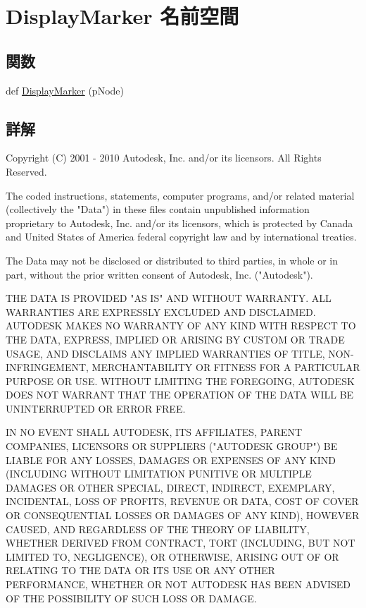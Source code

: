 \hypertarget{namespace_display_marker}{}\section{Display\+Marker 名前空間}
\label{namespace_display_marker}
\subsection*{関数}
\begin{DoxyCompactItemize}
\item 
def \hyperlink{namespace_display_marker_a8cd094b00b3f3c1b05570a7236e42bac}{Display\+Marker} (p\+Node)
\end{DoxyCompactItemize}


\subsection{詳解}
\begin{DoxyVerb} Copyright (C) 2001 - 2010 Autodesk, Inc. and/or its licensors.
 All Rights Reserved.

 The coded instructions, statements, computer programs, and/or related material 
 (collectively the "Data") in these files contain unpublished information 
 proprietary to Autodesk, Inc. and/or its licensors, which is protected by 
 Canada and United States of America federal copyright law and by international 
 treaties. 
 
 The Data may not be disclosed or distributed to third parties, in whole or in
 part, without the prior written consent of Autodesk, Inc. ("Autodesk").

 THE DATA IS PROVIDED "AS IS" AND WITHOUT WARRANTY.
 ALL WARRANTIES ARE EXPRESSLY EXCLUDED AND DISCLAIMED. AUTODESK MAKES NO
 WARRANTY OF ANY KIND WITH RESPECT TO THE DATA, EXPRESS, IMPLIED OR ARISING
 BY CUSTOM OR TRADE USAGE, AND DISCLAIMS ANY IMPLIED WARRANTIES OF TITLE, 
 NON-INFRINGEMENT, MERCHANTABILITY OR FITNESS FOR A PARTICULAR PURPOSE OR USE. 
 WITHOUT LIMITING THE FOREGOING, AUTODESK DOES NOT WARRANT THAT THE OPERATION
 OF THE DATA WILL BE UNINTERRUPTED OR ERROR FREE. 
 
 IN NO EVENT SHALL AUTODESK, ITS AFFILIATES, PARENT COMPANIES, LICENSORS
 OR SUPPLIERS ("AUTODESK GROUP") BE LIABLE FOR ANY LOSSES, DAMAGES OR EXPENSES
 OF ANY KIND (INCLUDING WITHOUT LIMITATION PUNITIVE OR MULTIPLE DAMAGES OR OTHER
 SPECIAL, DIRECT, INDIRECT, EXEMPLARY, INCIDENTAL, LOSS OF PROFITS, REVENUE
 OR DATA, COST OF COVER OR CONSEQUENTIAL LOSSES OR DAMAGES OF ANY KIND),
 HOWEVER CAUSED, AND REGARDLESS OF THE THEORY OF LIABILITY, WHETHER DERIVED
 FROM CONTRACT, TORT (INCLUDING, BUT NOT LIMITED TO, NEGLIGENCE), OR OTHERWISE,
 ARISING OUT OF OR RELATING TO THE DATA OR ITS USE OR ANY OTHER PERFORMANCE,
 WHETHER OR NOT AUTODESK HAS BEEN ADVISED OF THE POSSIBILITY OF SUCH LOSS
 OR DAMAGE. \end{DoxyVerb}
 

